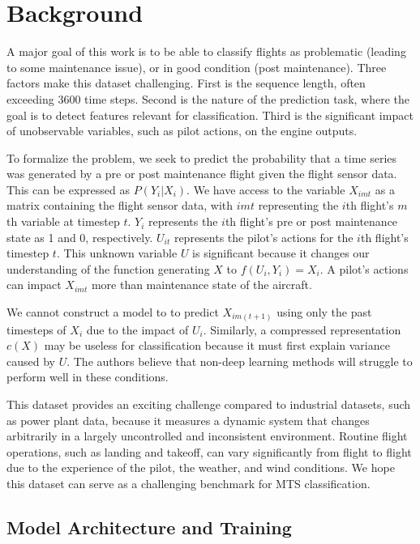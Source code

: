 \documentclass[letterpaper]{article} %
\begin{document}
\section{Background}

A major goal of this work is to be able to classify flights as problematic (leading to some maintenance issue), or in good condition (post maintenance). Three factors make this dataset challenging.  First is the sequence length, often exceeding 3600 time steps. Second is the nature of the prediction task, where the goal is to detect features relevant for classification. Third is the significant impact of unobservable variables, such as pilot actions, on the engine outputs.

To formalize the problem, we seek to predict the probability that a time series was generated by a pre or post maintenance flight given the flight sensor data. This can be expressed as \(P(Y_i | X_i)\). We have access to the variable \(X_{imt}\) as a matrix containing the flight sensor data, with \(imt\) representing the \(i\)th flight's \(m\)th variable at timestep \(t\). \(Y_i\) represents the \(i\)th flight's pre or post maintenance state as 1 and 0, respectively. \(U_{it}\) represents the pilot's actions for the \(i\)th flight's timestep \(t\). This unknown variable \(U\) is significant because it changes our understanding of the function generating \(X\) to \(f(U_i, Y_i) = X_i\). A pilot's actions can impact \(X_{imt}\) more than maintenance state of the aircraft.

We cannot construct a model to to predict \(X_{im(t+1)}\) using only the past timesteps of \(X_i\) due to the impact of \(U_i\). Similarly, a compressed representation \(c(X)\) may be useless for classification because it must first explain variance caused by \(U\). The authors believe that non-deep learning methods will struggle to perform well in these conditions.

This dataset provides an exciting challenge compared to industrial datasets, such as power plant data, because it measures a dynamic system that changes arbitrarily in a largely uncontrolled and inconsistent environment. Routine flight operations, such as landing and takeoff, can vary significantly from flight to flight due to the experience of the pilot, the weather, and wind conditions. We hope this dataset can serve as a challenging benchmark for MTS classification. 

\subsection{Model Architecture and Training}
\end{document}
